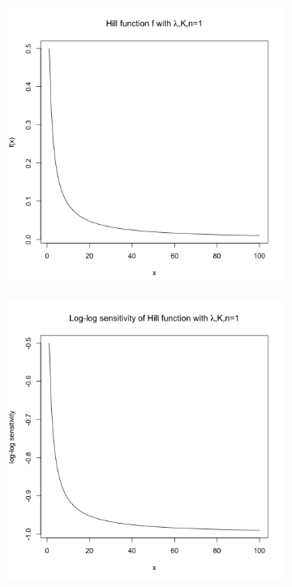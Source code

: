 \documentclass[a4paper,12pt]{article}
\begin{document}
\begin{figure}[!ht]
        \centering
        \begin{subfigure}[!ht]{0.7\textwidth}
        \centering
                \includegraphics[scale=0.45]{images/hill}
                \caption{}
                \label{hill}
        \end{subfigure}%
        
        \begin{subfigure}[b]{0.7\textwidth}
        \centering
                \includegraphics[scale=0.45]{images/log-log}
                \caption{}
                \label{log-log}
        \end{subfigure}
        

\end{figure}
\end{document}
